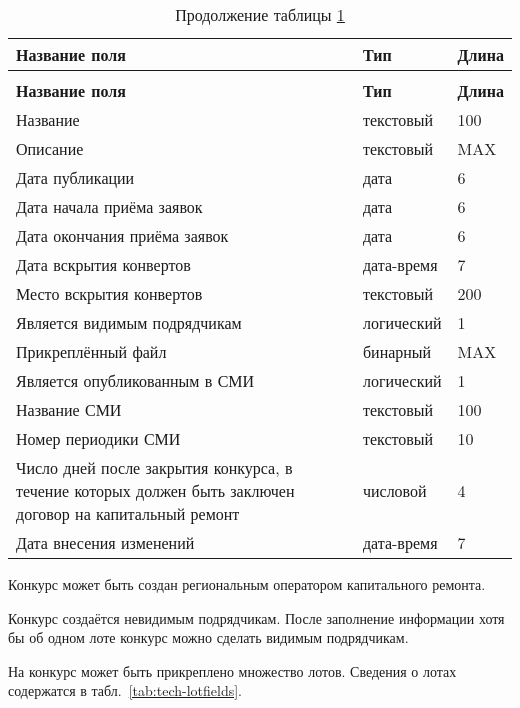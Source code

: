 \begin{footnotesize}
\begin{longtable}[h]{|p{}|p{}|p{}|}
	\caption{\label{tab:tech-contestfields}Сведения о конкурсе} \\
	\hline
		\textbf{Название поля} & \textbf{Тип} & \textbf{Длина} \\
	\hline \endfirsthead
	\caption*{Продолжение таблицы \ref{tab:tech-contestfields}}\\
	\hline
		\textbf{Название поля} & \textbf{Тип} & \textbf{Длина} \\
	\hline \endhead
		Название & текстовый & 100 \\
	\hline
		Описание & текстовый & MAX \\
	\hline
		Дата публикации & дата & 6 \\
	\hline
		Дата начала приёма заявок & дата & 6 \\
	\hline
		Дата окончания приёма заявок & дата & 6 \\
	\hline
		Дата вскрытия конвертов & дата-время & 7 \\
	\hline
		Место вскрытия конвертов & текстовый & 200 \\
	\hline
		Является видимым подрядчикам & логический & 1 \\
	\hline
		Прикреплённый файл & бинарный & MAX \\
	\hline
		Является опубликованным в СМИ & логический & 1 \\
	\hline
		Название СМИ & текстовый & 100 \\
	\hline
		Номер периодики СМИ & текстовый & 10 \\
	\hline
		Число дней после закрытия конкурса, в течение которых должен быть заключен договор на капитальный ремонт & числовой & 4 \\
	\hline
		Дата внесения изменений & дата-время & 7 \\
	\hline
\end{longtable}
\end{footnotesize}

Конкурс может быть создан региональным оператором капитального ремонта.

Конкурс создаётся невидимым подрядчикам.
После заполнение информации хотя бы об одном лоте конкурс можно сделать видимым подрядчикам.

На конкурс может быть прикреплено множество лотов.
Сведения о лотах содержатся в табл.~\ref{tab:tech-lotfields}.

